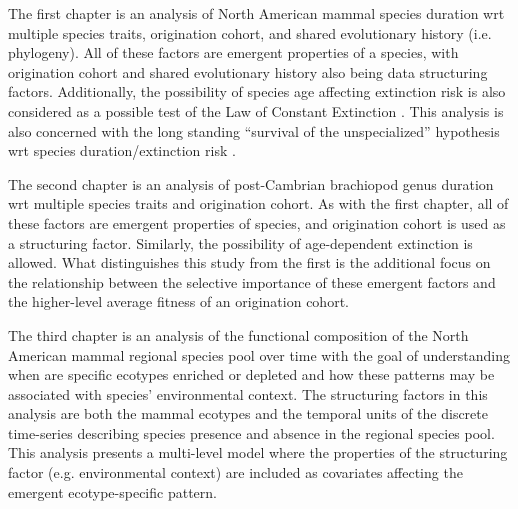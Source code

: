 The first chapter is an analysis of North American mammal species duration wrt multiple species traits, origination cohort, and shared evolutionary history (i.e. phylogeny). All of these factors are emergent properties of a species, with origination cohort and shared evolutionary history also being data structuring factors. Additionally, the possibility of species age affecting extinction risk is also considered as a possible test of the Law of Constant Extinction \citep{VanValen1973}. This analysis is also concerned with the long standing ``survival of the unspecialized'' hypothesis wrt species duration/extinction risk \citep{Simpson1944}.

The second chapter is an analysis of post-Cambrian brachiopod genus duration wrt multiple species traits and origination cohort. As with the first chapter, all of these factors are emergent properties of species, and origination cohort is used as a structuring factor. Similarly, the possibility of age-dependent extinction is allowed. What distinguishes this study from the first is the additional focus on the relationship between the selective importance of these emergent factors and the higher-level average fitness of an origination cohort.

The third chapter is an analysis of the functional composition of the North American mammal regional species pool over time with the goal of understanding when are specific ecotypes enriched or depleted and how these patterns may be associated with species' environmental context. The structuring factors in this analysis are both the mammal ecotypes and the temporal units of the discrete time-series describing species presence and absence in the regional species pool. This analysis presents a multi-level model where the properties of the structuring factor (e.g. environmental context) are included as covariates affecting the emergent ecotype-specific pattern. 



